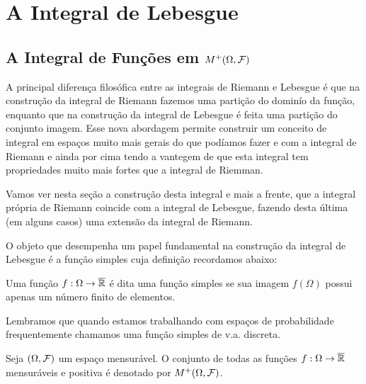 \chapter[Aula 9]{A Integral de Lebesgue}
\chaptermark{}

\section{A Integral de Funções em $M^{+}(\Omega,\mathcal{F})$}

A principal diferença filosófica entre as integrais de Riemann e 
Lebesgue é que na construção da integral de Riemann 
fazemos uma partição do dominío da função, enquanto que na construção da
integral de Lebesgue é feita uma partição do conjunto imagem.
Esse nova abordagem permite construir um conceito de integral em espaços
muito mais gerais do que podíamos fazer e com 
a integral de Riemann e ainda por cima tendo a vantegem 
de que esta integral tem propriedades muito mais fortes 
que a integral de Riemman. 

Vamos ver nesta seção a construção desta integral 
e mais a frente, que a integral própria 
de Riemann coincide com a integral de Lebesgue, fazendo
desta última (em alguns casos) uma extensão da integral 
de Riemann.

O objeto que desempenha um papel fundamental na 
construção da integral de Lebesgue é a função simples
cuja definição recordamos abaixo:
%
%
\begin{definicao}\label{def-funcao-simples}
Uma função $f:\Omega\to\overline{\mathbb{R}}$ é dita uma função simples
se sua imagem $f(\Omega)$ possui apenas um número
finito de elementos.
\end{definicao}
%
%
%
%
\begin{observacao}
Lembramos que quando estamos trabalhando com 
espaços de probabilidade frequentemente chamamos uma
função simples de v.a. discreta.
\end{observacao}


\begin{definicao}
Seja $(\Omega,\mathcal{F})$ um espaço mensurável. 
O conjunto de todas as funções $f:\Omega\to\overline{\mathbb{R}}$ 
mensuráveis e positiva é denotado por $M^{+}(\Omega,\mathcal{F})$.
\end{definicao}



